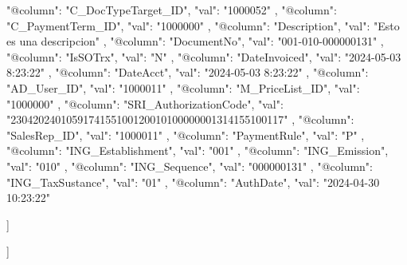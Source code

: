 {{{{{{                     {
                        "@column": "C_DocTypeTarget_ID",
                        "val": "1000052"
                    }, 
                         {
                        "@column": "C_PaymentTerm_ID",
                        "val": "1000000"
                    }, 
                     {
                        "@column": "Description",
                        "val": "Esto es una descripcion"
                    },
                       {
                        "@column": "DocumentNo",
                        "val": "001-010-000000131"
                    },
                    {
                        "@column": "IsSOTrx",
                        "val": "N"
                    },      
                     {
                        "@column": "DateInvoiced",
                        "val": "2024-05-03 8:23:22"
                    },     
                     {
                        "@column": "DateAcct",
                        "val": "2024-05-03 8:23:22"
                    },
                     {
                        "@column": "AD_User_ID",
                        "val": "1000011"
                    },
                     {
                        "@column": "M_PriceList_ID",
                        "val": "1000000"
                    },
                    {
                        "@column": "SRI_AuthorizationCode",
                        "val": "2304202401059174155100120010100000001314155100117"
                    },
                      {
                        "@column": "SalesRep_ID",
                        "val": "1000011"
                    },
                      {
                        "@column": "PaymentRule",
                        "val": "P"
                    },
                     {
                        "@column": "ING_Establishment",
                        "val": "001"
                    }, {
                        "@column": "ING_Emission",
                        "val": "010"
                    },
                     {
                        "@column": "ING_Sequence",
                        "val": "000000131"
                    },
                     {
                        "@column": "ING_TaxSustance",
                        "val": "01"
                    },
                     {
                        "@column": "AuthDate",
                        "val": "2024-04-30 10:23:22"
                    }
                    
                    ]
                    
                    }

                    }

                    }
                  

                  ]
              }

          
    }
}


























